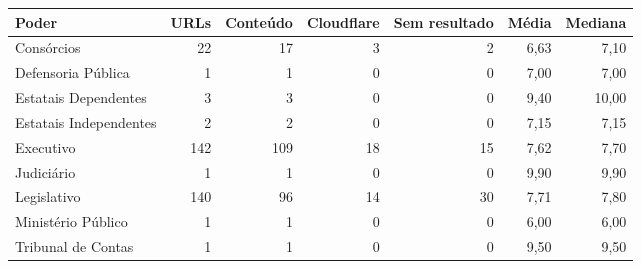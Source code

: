 \begin{tabular}{lrrrrrr}
\hline
Poder & URLs & Conteúdo & Cloudflare & Sem resultado & Média & Mediana \\
\hline
Consórcios & 22 & 17 & 3 & 2 & 6,63 & 7,10 \\
Defensoria Pública & 1 & 1 & 0 & 0 & 7,00 & 7,00 \\
Estatais Dependentes & 3 & 3 & 0 & 0 & 9,40 & 10,00 \\
Estatais Independentes & 2 & 2 & 0 & 0 & 7,15 & 7,15 \\
Executivo & 142 & 109 & 18 & 15 & 7,62 & 7,70 \\
Judiciário & 1 & 1 & 0 & 0 & 9,90 & 9,90 \\
Legislativo & 140 & 96 & 14 & 30 & 7,71 & 7,80 \\
Ministério Público & 1 & 1 & 0 & 0 & 6,00 & 6,00 \\
Tribunal de Contas & 1 & 1 & 0 & 0 & 9,50 & 9,50 \\
\hline
\end{tabular}
